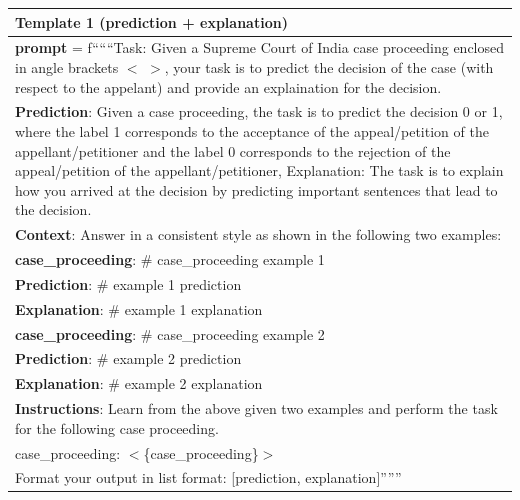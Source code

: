 \begin{table}[h]
    \centering
    \begin{tabular}{|p{}|}
    \hline
{\bf Template 1 (prediction + explanation)}\\
\hline
   
{\bf prompt} = f``````Task: Given a Supreme Court of India case proceeding enclosed in angle brackets $<$ $>$, your task is to predict the decision of the case (with respect to the appelant) and provide an explaination for the decision.\\


{\bf Prediction}: Given a case proceeding, the task is to predict the decision 0 or 1, where the label 1 corresponds to the acceptance of the appeal/petition of the appellant/petitioner and the label 0 corresponds to the rejection of the appeal/petition of the appellant/petitioner,  Explanation: The task is to explain how you arrived at the decision by predicting important sentences that lead to the decision. \\


{\bf Context}: Answer in a consistent style as shown in the following two examples: \\


  {\bf case\_proceeding}: \# case\_proceeding example 1\\


  {\bf Prediction}: \# example 1 prediction \\


  {\bf Explanation}: \# example 1 explanation\\


  {\bf case\_proceeding}: \# case\_proceeding example 2\\


 {\bf  Prediction}: \# example 2 prediction\\


 {\bf Explanation}: \# example 2 explanation\\


{\bf Instructions}: Learn from the above given two examples and perform the task for the following case proceeding. \\


case\_proceeding: $<$\{case\_proceeding\}$>$\\


Format your output in list format: [prediction, explanation]''''''\\


\end{tabular}
\end{table}
